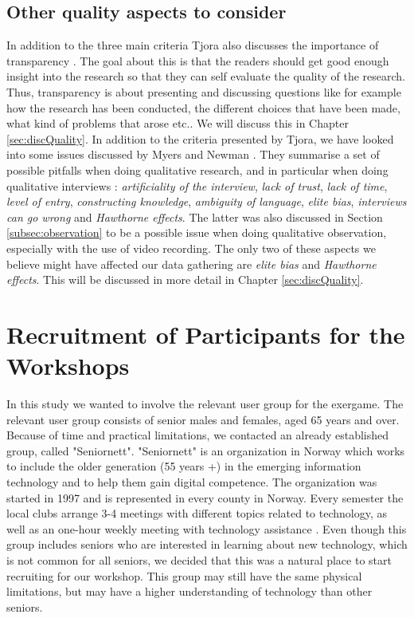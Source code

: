 \subsection{Other quality aspects to consider}
In addition to the three main criteria Tjora also discusses the importance of transparency \cite{tjora}. The goal about this is that the readers should get   good enough insight into the research so that they can self evaluate the quality of the research. Thus, transparency is about presenting and discussing questions like for example how the research has been conducted, the different choices that have been made, what kind of problems that arose etc.. We will discuss this in Chapter \ref{sec:discQuality}. In addition to the criteria presented by Tjora, we have looked into some issues discussed by Myers and Newman \cite{interview}. They summarise a set of possible pitfalls when doing qualitative research, and in particular when doing qualitative interviews \cite{interview}: \emph{artificiality of the interview}, \emph{lack of trust}, \emph{lack of time}, \emph{level of entry}, \emph{constructing knowledge}, \emph{ambiguity of language}, \emph{elite bias}, \emph{interviews can go wrong} and \emph{Hawthorne effects}. The latter was also discussed in Section \ref{subsec:observation} to be a possible issue when doing qualitative observation, especially with the use of video recording. The only two of these aspects we believe might have affected our data gathering are \emph{elite bias} and \emph{Hawthorne effects}. This will be discussed in more detail in Chapter \ref{sec:discQuality}.


\section{Recruitment of Participants for the Workshops}
In this study we wanted to involve the relevant user group for the exergame. The relevant user group consists of senior males and females, aged 65 years and over. Because of time and practical limitations, we contacted an already established group, called "Seniornett". "Seniornett" is an organization in Norway which works to include the older generation (55 years +) in the emerging information technology and to help them gain digital competence. The organization was started in 1997 and is represented in every county in Norway.  Every semester the local clubs arrange 3-4 meetings with different topics related to technology, as well as an one-hour weekly meeting with technology assistance \cite{seniornett}. Even though this group includes seniors who are interested in learning about new technology, which is not common for all seniors, we decided that this was a natural place to start recruiting for our workshop. This group may still have the same physical limitations, but may have a higher understanding of technology than other seniors. 

